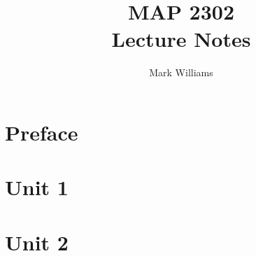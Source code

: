 \documentclass{report}
\title{\Huge{MAP 2302}\\Lecture Notes}
\author{\huge{Mark Williams}}
\date{}
\begin{document}
\maketitle
\newpage
{}
\tableofcontents
\pagebreak

\chapter{Preface}

\pagebreak
\chapter{Unit 1}

\chapter{Unit 2}

\end{document}
